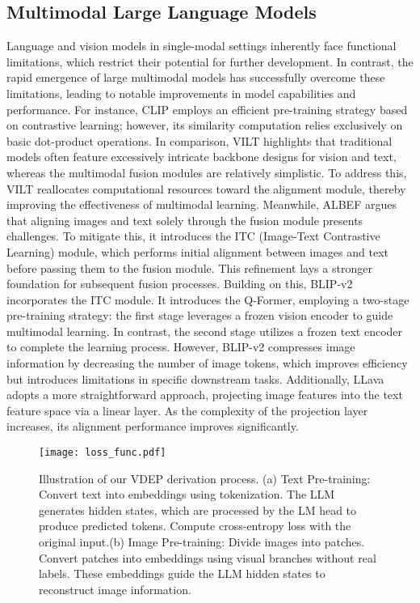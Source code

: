 \subsection{Multimodal Large Language Models}
Language and vision models in single-modal settings inherently face functional limitations, which restrict their potential for further development. In contrast, the rapid emergence of large multimodal models has successfully overcome these limitations, leading to notable improvements in model capabilities and performance. For instance, CLIP\cite{radford2021learning} employs an efficient pre-training strategy based on contrastive learning; however, its similarity computation relies exclusively on basic dot-product operations. In comparison, VILT\cite{kim2021vilt} highlights that traditional models often feature excessively intricate backbone designs for vision and text, whereas the multimodal fusion modules are relatively simplistic. To address this, VILT reallocates computational resources toward the alignment module, thereby improving the effectiveness of multimodal learning. Meanwhile, ALBEF\cite{li2021align} argues that aligning images and text solely through the fusion module presents challenges. To mitigate this, it introduces the ITC (Image-Text Contrastive Learning) module, which performs initial alignment between images and text before passing them to the fusion module. This refinement lays a stronger foundation for subsequent fusion processes. Building on this, BLIP-v2\cite{li2023blip} incorporates the ITC module. It introduces the Q-Former, employing a two-stage pre-training strategy: the first stage leverages a frozen vision encoder to guide multimodal learning. In contrast, the second stage utilizes a frozen text encoder to complete the learning process. However, BLIP-v2 compresses image information by decreasing the number of image tokens, which improves efficiency but introduces limitations in specific downstream tasks. Additionally, LLava\cite{liu2024visual} adopts a more straightforward approach, projecting image features into the text feature space via a linear layer. As the complexity of the projection layer increases, its alignment performance improves significantly.
\begin{figure*}[ht]
\vskip 0.2in
\begin{center}
\centerline{\texttt{[image: loss\_func.pdf]}}
\caption{Illustration of our VDEP derivation process.
(a) Text Pre-training: Convert text into embeddings using tokenization. The LLM generates hidden states, which are processed by the LM head to produce predicted tokens. Compute cross-entropy loss with the original input.(b) Image Pre-training: Divide images into patches. Convert patches into embeddings using visual branches without real labels. These embeddings guide the LLM hidden states to reconstruct image information.}
\label{VDEP_derivation}
\end{center}
\vskip -0.2in
\end{figure*}



